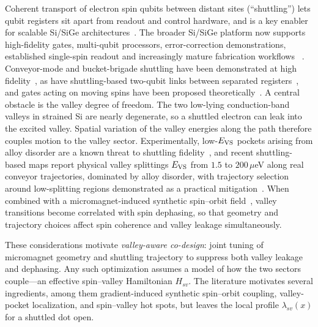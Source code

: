 \documentclass[aip,jap,reprint,superscriptaddress,longbibliography,floatfix]{revtex4-2}
\begin{document}
Coherent transport of electron spin qubits between distant sites
(``shuttling'') lets qubit registers sit apart from readout and control
hardware, and is a key enabler for scalable Si/SiGe
architectures~\cite{kunne_spinbus_2024,langrock_blueprint_2023,gonzalez-zalba_scaling_2021,veldhorst_silicon_2017,li_crossbar_2018,vandersypen_interfacing_2017}.
The broader Si/SiGe platform now supports high-fidelity gates, multi-qubit
processors, error-correction demonstrations, established single-spin readout
and increasingly mature fabrication workflows
~\cite{xue_quantum_2022,tanttu_assessment_2024,huang_high-fidelity_2024,philips_universal_2022,fernandez_de_fuentes_running_2026,thorvaldson_grovers_2025,takeda_quantum_2022,meunier_silicon_2025,koch_industrial_2025,elsayed_low_2024,hanson_spins_2007,burkard_semiconductor_2023,morello_single-shot_2010,hu_single-electron_2025}.
Conveyor-mode and bucket-brigade shuttling have been demonstrated at high
fidelity~\cite{de_smet_high-fidelity_2025,seidler_conveyor-mode_2022,mills_shuttling_2019},
as have shuttling-based two-qubit links between separated
registers~\cite{noiri_shuttling-based_2022,matsumoto_two-qubit_2025,ademi_distributing_2025},
and gates acting on moving spins have been proposed
theoretically~\cite{fernandez-fernandez_spin-orbit-enabled_2025}.
A central obstacle is the valley degree of freedom.
The two low-lying conduction-band valleys in strained Si are nearly
degenerate, so a shuttled electron can leak into the excited valley. Spatial
variation of the valley energies along the path therefore couples motion to the
valley sector.
Experimentally, low-$E_{\rm VS}$
pockets arising from alloy disorder are a known threat to shuttling
fidelity~\cite{paquelet_wuetz_atomic_2022,losert_strategies_2024,zwerver_shuttling_2023},
and recent shuttling-based maps report physical valley splittings
$E_{\rm VS}$ from
$1.5$ to $200\,\mu$eV along real conveyor
trajectories, dominated by alloy disorder, with trajectory selection
around low-splitting regions demonstrated as a practical
mitigation~\cite{volmer_impact_2026}. When combined with a micromagnet-induced synthetic
spin--orbit field~\cite{unseld_baseband_2025,yoneda_quantum-dot_2018},
valley transitions become correlated with spin
dephasing, so that geometry and trajectory choices affect spin
coherence and valley leakage simultaneously.

These considerations motivate \emph{valley-aware co-design}: joint tuning of
micromagnet geometry and shuttling trajectory to suppress both valley leakage
and dephasing. Any such optimization assumes a model of how the two sectors
couple---an effective spin--valley Hamiltonian $H_{sv}$. The literature
motivates several ingredients, among them gradient-induced synthetic
spin--orbit coupling, valley-pocket localization, and spin--valley hot spots,
but leaves the local profile $\lambda_{sv}(x)$ for a shuttled dot open.
\end{document}
